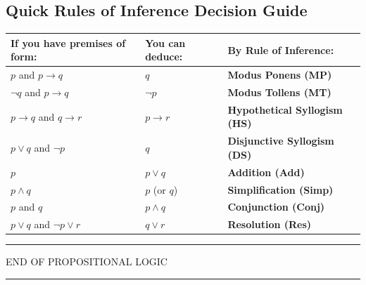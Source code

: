 \documentclass[11pt,a4paper]{article}
\begin{document}
\subsection{Quick Rules of Inference Decision Guide}
\begin{center}
\renewcommand{\arraystretch}{1.25}
\small
\begin{tabularx}{\linewidth}{|l|l|X|}
\hline
\rowcolor{navy!15} \textbf{If you have premises of form:} & \textbf{You can deduce:} & \textbf{By Rule of Inference:} \\
\hline
$p$ and $p \rightarrow q$ & $q$ & \textbf{Modus Ponens (MP)} \\
$\neg q$ and $p \rightarrow q$ & $\neg p$ & \textbf{Modus Tollens (MT)} \\
$p \rightarrow q$ and $q \rightarrow r$ & $p \rightarrow r$ & \textbf{Hypothetical Syllogism (HS)} \\
$p \vee q$ and $\neg p$ & $q$ & \textbf{Disjunctive Syllogism (DS)} \\
$p$ & $p \vee q$ & \textbf{Addition (Add)} \\
$p \wedge q$ & $p$ (or $q$) & \textbf{Simplification (Simp)} \\
$p$ and $q$ & $p \wedge q$ & \textbf{Conjunction (Conj)} \\
$p \vee q$ and $\neg p \vee r$ & $q \vee r$ & \textbf{Resolution (Res)} \\
\hline
\end{tabularx}
\end{center}

\vspace{0.6cm}
\begin{center}
{\color{navy}\bfseries\rule{0.25\textwidth}{0.8pt} \quad \MakeUppercase{End of Propositional Logic} \quad \rule{0.25\textwidth}{0.8pt}}
\end{center}
\end{document}
